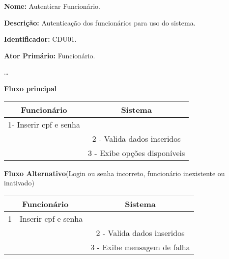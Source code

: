 	\par
	\textbf{Nome:} Autenticar Funcionário. 
	\par
	\textbf{Descrição:} Autenticação dos funcionários para uso do sistema.
	\par 
	\textbf{Identificador:} CDU01.
	\par
	\textbf{Ator Primário:} Funcionário.	
	\par
	\ldots
	\par
	\textbf{Fluxo principal}\par
	\begin{tabular}{|c|c|}
		\hline 
		Funcionário & Sistema \\ 
		\hline 
		1- Inserir cpf e senha  &  \\ 
		\hline 
		& 
		
		2 - Valida dados inseridos 
		\\ 
		\hline 
		& 
		
		3 - Exibe opções disponíveis
		\\ 
		\hline 
	\end{tabular} 
	\vspace{12px}
	\par
	\textbf{Fluxo Alternativo}(Login ou senha incorreto, funcionário inexistente ou inativado)\par
	\begin{tabular}{|c|c|}
		\hline 
		Funcionário & Sistema \\ 
		\hline 
		1 - Inserir cpf e senha  &  \\ 
		\hline 
		& 
		
		2 - Valida dados inseridos 
		\\ 
		\hline 
		& 
				
		3 - Exibe mensagem de falha		
		\\ 
		\hline 
	\end{tabular} 
	\vspace{12px}

